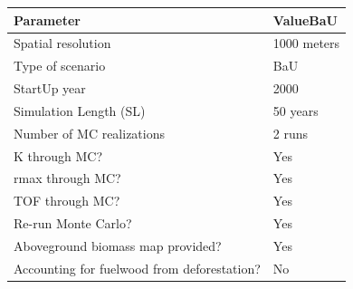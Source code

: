 \begin{tabular}{@{}l l@{}}
\toprule
\rowcolor{mfgreen!12}\textbf{Parameter} & \textbf{ValueBaU}\\
\midrule
Spatial resolution & 1000 meters\\
\rowcolor{mfgreen!4}Type of scenario & BaU\\
StartUp year & 2000\\
\rowcolor{mfgreen!4}Simulation Length (SL) & 50 years\\
Number of MC realizations & 2 runs\\
\rowcolor{mfgreen!4}K through MC? & Yes\\
rmax through MC? & Yes\\
\rowcolor{mfgreen!4}TOF through MC? & Yes\\
Re-run Monte Carlo? & Yes\\
\rowcolor{mfgreen!4}Aboveground biomass map provided? & Yes\\
Accounting for fuelwood from deforestation? & No\\
\bottomrule
\end{tabular}

